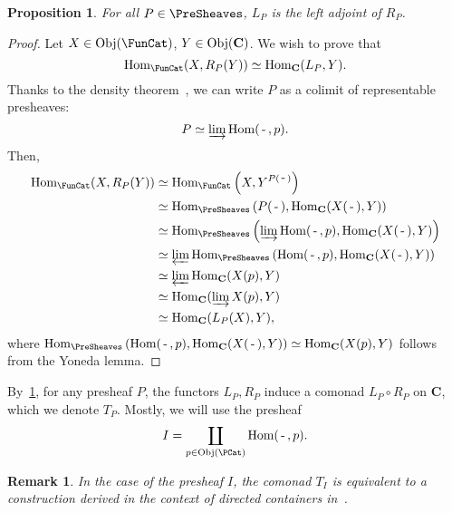 \documentclass[12pt]{article}
\newtheorem{remark}{Remark}
\newtheorem{proposition}{Proposition}
\newcommand{\Hom}{{\textnormal{Hom}}}
\newcommand{\Obj}{{\textnormal{Obj}}}
\newcommand{\Cat}{{\mathbf{C}}}
\newcommand{\anon}{{\,\mbox{-}\,}}
\begin{document}
    \begin{proposition}\label{prop:adjunction}
        For all $P \in \PreSheaves$, $L_P$ is the left adjoint of $R_P$.
    \end{proposition}
    \begin{proof}
        Let $X \in \Obj(\FunCat)$, $Y \in \Obj(\Cat)$. We wish to prove that
        \begin{equation*}
            \Hom_{\FunCat}(X, R_P(Y)) \simeq \Hom_\Cat(L_P, Y).
        \end{equation*}
        Thanks to the density theorem~\cite[Chapt.~3.7]{mac2013categories}, we can write $P$ as a colimit of representable presheaves:
        \begin{equation*}
            P \simeq \varinjlim \Hom(\anon, p).
        \end{equation*}
        Then,
        \begin{align*}
            \Hom_{\FunCat}(X, R_P(Y))
            &\simeq \Hom_{\FunCat}\left(X, Y ^ {P(\anon)}\right) \\
            &\simeq \Hom_{\PreSheaves}\left(P(\anon), \Hom_\Cat(X(\anon), Y)\right) \\
            &\simeq \Hom_{\PreSheaves}\left(\varinjlim \Hom(\anon, p), \Hom_\Cat(X(\anon), Y)\right) \\
            &\simeq \varprojlim\Hom_{\PreSheaves}\left(\Hom(\anon, p), \Hom_\Cat(X(\anon), Y)\right) \\
            &\simeq \varprojlim\Hom_\Cat(X(p), Y)\\
            &\simeq \Hom_\Cat(\varinjlim X(p), Y)\\
            &\simeq \Hom_\Cat(L_P(X), Y),
        \end{align*}
        where $\Hom_{\PreSheaves}\left(\Hom(\anon, p), \Hom_\Cat(X(\anon), Y)\right) \simeq \Hom_\Cat(X(p), Y)$ follows from the Yoneda lemma.
    \end{proof}

    By~\cref{prop:adjunction}, for any presheaf $P$, the functors $L_P, R_P$ induce a comonad $L_P\circ R_P$ on $\Cat$, which we denote $T_P$. Mostly, we will use the presheaf
    \begin{equation*}
        I = \coprod_{p \in \Obj(\PCat)} \Hom(\anon, p).
    \end{equation*}
    \begin{remark}
        In the case of the presheaf $I$, the comonad $T_I$ is equivalent to a construction derived in the context of {\em directed containers} in~\cite{Ahman_2016}.
    \end{remark}
   
\end{document}

